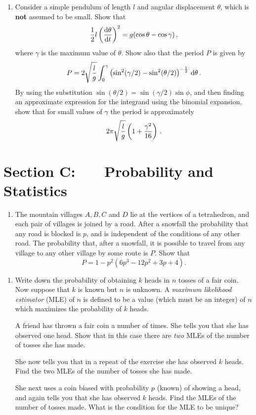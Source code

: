 \documentclass[a4, 11pt]{report}
\newlength{\qspace}
\newcounter{qnumber}
\newenvironment{question}%
 {\vspace{\qspace}
  \begin{enumerate}[\bfseries 1\quad][10]%
    \setcounter{enumi}{\value{qnumber}}%
    \item%
 }
{
  \end{enumerate}
  \filbreak
  \stepcounter{qnumber}
 }
\def\d{{\rm d}}
\begin{document}
\begin{question}
Consider a simple pendulum of length $l$ and angular displacement
$\theta$, which is {\bf not} assumed to be small. Show that
$$
{1\over 2}l \left({\d\theta\over \d t}\right)^2 = g(\cos\theta
-\cos\gamma)\,,
$$
where $\gamma$ is the maximum value of $\theta$. Show also that
the period $P$ is given by
$$
P= 2 \sqrt{l\over g} \int_0^\gamma \left(
\sin^2(\gamma/2)-\sin^2(\theta/2)
\right)^{-{1\over 2}} \,\d\theta \,.
$$
By using the substitution $\sin(\theta/2)=\sin(\gamma/2) \sin\phi$,
and then finding an approximate expression for the integrand using
the binomial expansion,
show that for small values of $\gamma$ the period is approximately
$$
2\pi \sqrt{l\over g} \left(1+{\gamma^2\over 16}\right) \,.
$$
\end{question}
	

	
	\newpage
\section*{Section C: \ \ \ Probability and Statistics}


\begin{question}
The mountain villages $A,B,C$ and $D$ lie at the vertices of a
tetrahedron, and each pair of villages is joined by a road. After
a snowfall the probability that any road is blocked is $p$, and 
is independent of the conditions of any other road. The 
probability that, after a snowfall,
 it is possible to travel from any village to
any other village by some route is $P$.  Show that 
$$
P =1- p^2(6p^3-12p^2+3p+4).
$$


\end{question}

\begin{question}
Write down the probability of obtaining $k$ heads in $n$ tosses
of a fair coin. Now suppose that $k$ is known but $n$ is unknown.
A {\em maximum likelihood estimator} (MLE) of $n$ is defined
to be a value (which must be an integer) of $n$ which maximizes 
the probability of $k$ heads.

A friend has thrown a fair coin a number of times. She
tells you that she has observed one head. Show that in this case there
are {\em two} MLEs of the number of tosses she has made. 

She now tells you that in a repeat of the exercise she has 
observed $k$ heads.  Find the two MLEs of the number of tosses 
she has made. 

She next uses a coin biased with probability $p$ (known) of showing 
a head, and again tells you that she has observed $k$ heads.
Find the MLEs of the number of tosses made. What is the condition for 
the MLE to be unique?
\end{question}
\end{document}
